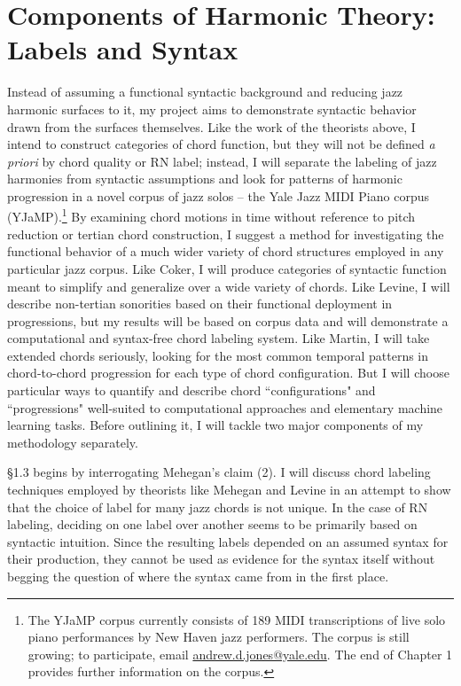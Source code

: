 \section{Components of Harmonic Theory: Labels and Syntax}
Instead of assuming a functional syntactic background and reducing jazz harmonic surfaces to it, my project aims to demonstrate syntactic behavior drawn from the surfaces themselves.  Like the work of the theorists above, I intend to construct categories of chord function, but they will not be defined \emph{a priori} by chord quality or RN label; instead, I will separate the labeling of jazz harmonies from syntactic assumptions and look for patterns of harmonic progression in a novel corpus of jazz solos -- the Yale Jazz MIDI Piano corpus (YJaMP).\footnote{The YJaMP corpus currently consists of 189 MIDI transcriptions of live solo piano performances by New Haven jazz performers.  The corpus is still growing; to participate, email \href{mailto:andrew.d.jones@yale.edu}{andrew.d.jones@yale.edu}.  The end of Chapter 1 provides further information on the corpus.}  By examining chord motions in time without reference to pitch reduction or tertian chord construction, I suggest a method for investigating the functional behavior of a much wider variety of chord structures employed in any particular jazz corpus.  Like Coker, I will produce categories of syntactic function meant to simplify and generalize over a wide variety of chords.  Like Levine, I will describe non-tertian sonorities based on their functional deployment in progressions, but my results will be based on corpus data and will demonstrate a computational and syntax-free chord labeling system.  Like Martin, I will take extended chords seriously, looking for the most common temporal patterns in chord-to-chord progression for each type of chord configuration.  But I will choose particular ways to quantify and describe chord ``configurations" and ``progressions" well-suited to computational approaches and elementary machine learning tasks.  Before outlining it, I will tackle two major components of my methodology separately.

\S 1.3 begins by interrogating Mehegan's claim (2).  I will discuss chord labeling techniques employed by theorists like Mehegan and Levine in an attempt to show that the choice of label for many jazz chords is not unique.  In the case of RN labeling, deciding on one label over another seems to be primarily based on syntactic intuition.  Since the resulting labels depended on an assumed syntax for their production, they cannot be used as evidence for the syntax itself without begging the question of where the syntax came from in the first place.

